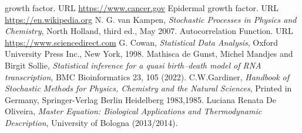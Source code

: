 \documentclass[12pt,a4paper]{report}
\begin{document}
\begin{thebibliography}{bibliography}
     growth factor. URL \href{https://www.cancer.gov/publications/dictionaries/cancer-terms/def/growth-factor}{https://www.cancer.gov}
     Epidermal growth factor. URL \href{https://en.wikipedia.org/wiki/Epidermal_growth_factor}{https://en.wikipedia.org}
     N. G. van Kampen, {\em Stochastic Processes in Physics and Chemistry}, North Holland, third ed., May 2007.
     Autocorrelation Function. URL \href{https://www.sciencedirect.com/topics/chemistry/autocorrelation-function#:~:text=1%20Autocorrelation-,The%20autocorrelation%20function%20(ACF)%20defines%20how%20data%20points%20in%20a,signal%20over%20different%20delay%20times.}{https://www.sciencedirect.com}
     G. Cowan, {\em Statistical Data Analysis}, Oxford University Press Inc., New York, 1998.
     Mathisca de Gunst, Michel Mandjes and Birgit Sollie, {\em Statistical inference for a quasi birth–death model of RNA transcription}, BMC Bioinformatics 23, 105 (2022).
     C.W.Gardiner, {\em Handbook of Stochastic Methods for Physics, Chemistry and the Natural Sciences}, Printed in Germany, Springer-Verlag Berlin Heidelberg 1983,1985.
     Luciana Renata De Oliveira, {\em Master Equation: Biological Applications and Thermodynamic Description}, University of Bologna (2013/2014).


\end{thebibliography}
\end{document}
